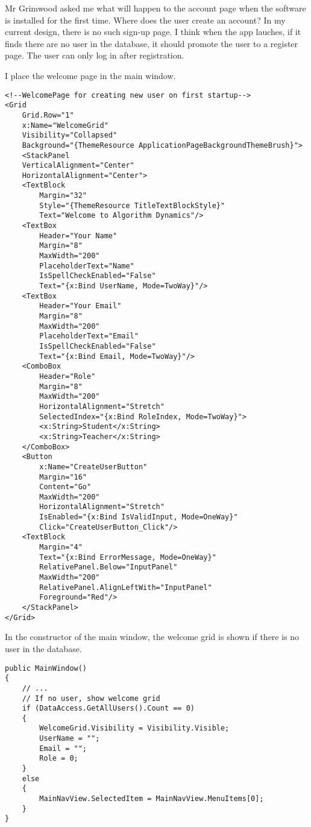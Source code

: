 \documentclass[report.tex]{subfiles}
\begin{document}
Mr Grimwood asked me what will happen to the account page when the software is installed for the first time. Where does the user create an account? In my current design, there is no such sign-up page. I think when the app lauches, if it finds there are no user in the database, it should promote the user to a register page. The user can only log in after registration.

I place the welcome page in the main window.

\begin{verbatim}
<!--WelcomePage for creating new user on first startup-->
<Grid
    Grid.Row="1"
    x:Name="WelcomeGrid"
    Visibility="Collapsed"
    Background="{ThemeResource ApplicationPageBackgroundThemeBrush}">
    <StackPanel
    VerticalAlignment="Center"
    HorizontalAlignment="Center">
    <TextBlock 
        Margin="32"
        Style="{ThemeResource TitleTextBlockStyle}"
        Text="Welcome to Algorithm Dynamics"/>
    <TextBox
        Header="Your Name"
        Margin="8"
        MaxWidth="200"
        PlaceholderText="Name"
        IsSpellCheckEnabled="False"
        Text="{x:Bind UserName, Mode=TwoWay}"/>
    <TextBox
        Header="Your Email"
        Margin="8"
        MaxWidth="200"
        PlaceholderText="Email"
        IsSpellCheckEnabled="False"
        Text="{x:Bind Email, Mode=TwoWay}"/>
    <ComboBox
        Header="Role"
        Margin="8"
        MaxWidth="200"
        HorizontalAlignment="Stretch"
        SelectedIndex="{x:Bind RoleIndex, Mode=TwoWay}">
        <x:String>Student</x:String>
        <x:String>Teacher</x:String>
    </ComboBox>
    <Button 
        x:Name="CreateUserButton"
        Margin="16"
        Content="Go"
        MaxWidth="200"
        HorizontalAlignment="Stretch"
        IsEnabled="{x:Bind IsValidInput, Mode=OneWay}"
        Click="CreateUserButton_Click"/>
    <TextBlock
        Margin="4"
        Text="{x:Bind ErrorMessage, Mode=OneWay}"
        RelativePanel.Below="InputPanel"
        MaxWidth="200"
        RelativePanel.AlignLeftWith="InputPanel"
        Foreground="Red"/>
    </StackPanel>
</Grid>
\end{verbatim}

In the constructor of the main window, the welcome grid is shown if there is no user in the database.

\begin{verbatim}
public MainWindow()
{
    // ...
    // If no user, show welcome grid
    if (DataAccess.GetAllUsers().Count == 0)
    {
        WelcomeGrid.Visibility = Visibility.Visible;
        UserName = "";
        Email = "";
        Role = 0;
    }
    else
    {
        MainNavView.SelectedItem = MainNavView.MenuItems[0];
    }
}
\end{verbatim}
\end{document}
